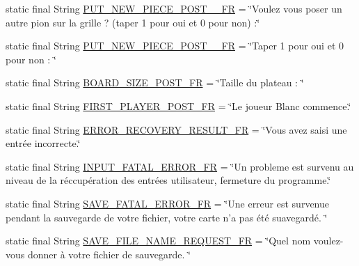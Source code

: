 \begin{DoxyCompactItemize}
\item 
static final String \hyperlink{interfacecom_1_1publisher_1_1utils_1_1PostsPublisher_ab94d2dfd2e8b0196d726fce220a8ca00}{P\-U\-T\-\_\-\-N\-E\-W\-\_\-\-P\-I\-E\-C\-E\-\_\-\-P\-O\-S\-T\-\_\-\_\-\-F\-R} = \char`\"{}Voulez vous poser un autre pion sur la grille ? (taper 1 pour oui et 0 pour non) \-:\char`\"{}
\item 
static final String \hyperlink{interfacecom_1_1publisher_1_1utils_1_1PostsPublisher_a6d9b06488e191feae24c934fee998603}{P\-U\-T\-\_\-\-N\-E\-W\-\_\-\-P\-I\-E\-C\-E\-\_\-\-P\-O\-S\-T\-\_\-\_\-\-F\-R} = \char`\"{}Taper 1 pour oui et 0 pour non \-: \char`\"{}
\item 
static final String \hyperlink{interfacecom_1_1publisher_1_1utils_1_1PostsPublisher_ac6b756c7ba49be88819412b11cd46455}{B\-O\-A\-R\-D\-\_\-\-S\-I\-Z\-E\-\_\-\-P\-O\-S\-T\-\_\-\-F\-R} = \char`\"{}Taille du plateau \-: \char`\"{}
\item 
static final String \hyperlink{interfacecom_1_1publisher_1_1utils_1_1PostsPublisher_a2cabdd9b4594eef0dab6dd7093d98c8a}{F\-I\-R\-S\-T\-\_\-\-P\-L\-A\-Y\-E\-R\-\_\-\-P\-O\-S\-T\-\_\-\-F\-R} = \char`\"{}Le joueur Blanc commence.\char`\"{}
\item 
static final String \hyperlink{interfacecom_1_1publisher_1_1utils_1_1PostsPublisher_a7a9848b920f91978b1e941cefd7ad7d6}{E\-R\-R\-O\-R\-\_\-\-R\-E\-C\-O\-V\-E\-R\-Y\-\_\-\-R\-E\-S\-U\-L\-T\-\_\-\-F\-R} = \char`\"{}Vous avez saisi une entrée incorrecte.\char`\"{}
\item 
static final String \hyperlink{interfacecom_1_1publisher_1_1utils_1_1PostsPublisher_a304b32e5353013f19b84c34dd0506c84}{I\-N\-P\-U\-T\-\_\-\-F\-A\-T\-A\-L\-\_\-\-E\-R\-R\-O\-R\-\_\-\-F\-R} = \char`\"{}Un probleme est survenu au niveau de la réccupération des entrées utilisateur, fermeture du programme.\char`\"{}
\item 
static final String \hyperlink{interfacecom_1_1publisher_1_1utils_1_1PostsPublisher_aee8873fc53cc04fc1aede9bc30f9f2ab}{S\-A\-V\-E\-\_\-\-F\-A\-T\-A\-L\-\_\-\-E\-R\-R\-O\-R\-\_\-\-F\-R} = \char`\"{}Une erreur est survenue pendant la sauvegarde de votre fichier, votre carte n'a pas été suavegardé. \char`\"{}
\item 
static final String \hyperlink{interfacecom_1_1publisher_1_1utils_1_1PostsPublisher_a75168141893a8674077c9ace12446bdd}{S\-A\-V\-E\-\_\-\-F\-I\-L\-E\-\_\-\-N\-A\-M\-E\-\_\-\-R\-E\-Q\-U\-E\-S\-T\-\_\-\-F\-R} = \char`\"{}Quel nom voulez-\/vous donner à votre fichier de sauvegarde. \char`\"{}
\item 

\end{DoxyCompactItemize}
